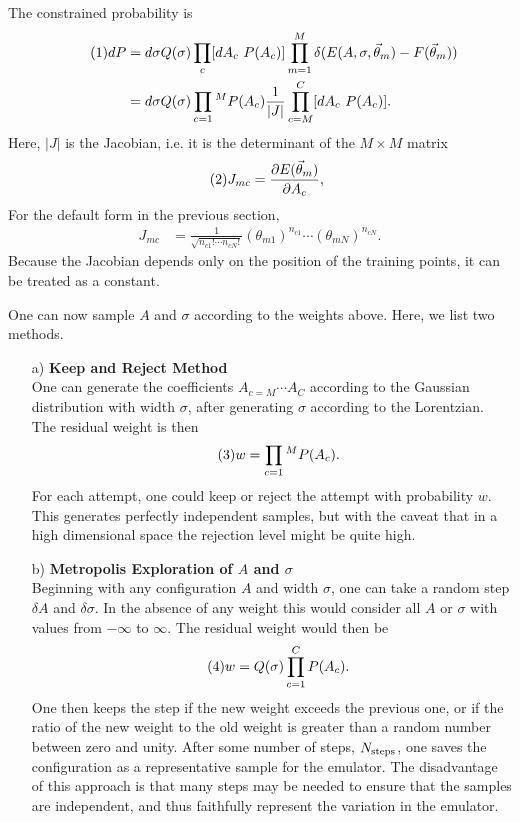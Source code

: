 \documentclass[12pt]{article}
\numberwithin{equation}{section}
\numberwithin{figure}{section}
\newcommand\eqnumber{\addtocounter{equation}{1}\tag{\theequation}}
\begin{document}
The constrained probability is
\begin{align*}\eqnumber
dP&=d\sigma Q(\sigma)\prod_c[dA_c~P(A_c)]\prod_{m=1}^M \delta(E(A,\sigma,\vec{\theta}_m)-F(\vec{\theta}_m))\\
&=d\sigma Q(\sigma) \prod_{c=1}{^M}P(A_c)\frac{1}{|J|} \prod_{c=M}^C [dA_c~P(A_c)].
\end{align*}
Here, $|J|$ is the Jacobian, i.e. it is the determinant of the $M\times M$ matrix
\begin{align*}\eqnumber
J_{mc}&=\frac{\partial E(\vec{\theta}_m)}{\partial A_c},
\end{align*}
For the default form in the previous section,
\begin{eqnarray}
J_{mc}&=\frac{1}{\sqrt{n_{c1}!\cdots n_{cN}!}}(\theta_{m1})^{n_{c1}}\cdots(\theta_{mN})^{n_{cN}}.
\end{eqnarray}
Because the Jacobian depends only on the position of the training points, it can be treated as a constant. 

One can now sample $A$ and $\sigma$ according to the weights above. Here, we list two methods.

\begin{itemize}\itemsep=0pt
\item [a)] {\bf Keep and Reject Method}\\
One can generate the coefficients $A_{c=M}\cdots A_{C}$ according to the Gaussian distribution with width $\sigma$, after generating $\sigma$ according to the Lorentzian. The residual weight is then
\begin{align*}\eqnumber
w&=\prod_{c=1}{^M}P(A_c).
\end{align*}
For each attempt, one could keep or reject the attempt with probability $w$. This generates perfectly independent samples, but with the caveat that in a high dimensional space the rejection level might be quite high.
\item [b)] {\bf Metropolis Exploration of $A$ and $\sigma$}\\
Beginning with any configuration $A$ and width $\sigma$, one can take a random step $\delta A$ and $\delta\sigma$. In the absence of any weight this would consider all $A$ or $\sigma$ with values from $-\infty$ to $\infty$. The residual weight would then be
\begin{align*}\eqnumber
w&=Q(\sigma)\prod_{c=1}^C P(A_c).
\end{align*}
One then keeps the step if the new weight exceeds the previous one, or if the ratio of the new weight to the old weight is greater than a random number between zero and unity. After some number of steps, $N_{\rm steps}$, one saves the configuration as a representative sample for the emulator. The disadvantage of this approach is that many steps may be needed to ensure that the samples are independent, and thus faithfully represent the variation in the emulator.
\end{itemize}
\end{document}
